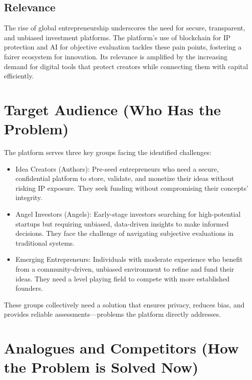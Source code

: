 \documentclass[12pt]{article}
\begin{document}
\subsection{Relevance}
The rise of global entrepreneurship underscores the need for secure, transparent, and unbiased investment platforms. The platform's use of blockchain for IP protection and AI for objective evaluation tackles these pain points, fostering a fairer ecosystem for innovation. Its relevance is amplified by the increasing demand for digital tools that protect creators while connecting them with capital efficiently.

\section{Target Audience (Who Has the Problem)}

The platform serves three key groups facing the identified challenges:

\begin{itemize}
    \item Idea Creators (Authors): Pre-seed entrepreneurs who need a secure, confidential platform to store, validate, and monetize their ideas without risking IP exposure. They seek funding without compromising their concepts' integrity.
    \item Angel Investors (Angels): Early-stage investors searching for high-potential startups but requiring unbiased, data-driven insights to make informed decisions. They face the challenge of navigating subjective evaluations in traditional systems.
    \item Emerging Entrepreneurs: Individuals with moderate experience who benefit from a community-driven, unbiased environment to refine and fund their ideas. They need a level playing field to compete with more established founders.
\end{itemize}

These groups collectively need a solution that ensures privacy, reduces bias, and provides reliable assessments—problems the platform directly addresses.

\section{Analogues and Competitors (How the Problem is Solved Now)}
\end{document}
